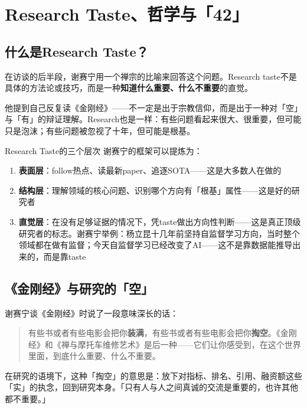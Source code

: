 \documentclass[a4paper]{article}
\begin{document}
\section{Research Taste、哲学与「42」}

\subsection{什么是Research Taste？}

在访谈的后半段，谢赛宁用一个禅宗的比喻来回答这个问题。Research taste不是具体的方法论或技巧，而是一种\textbf{知道什么重要、什么不重要}的直觉。

他提到自己反复读《金刚经》——不一定是出于宗教信仰，而是出于一种对「空」与「有」的辩证理解。Research也是一样：有些问题看起来很大、很重要，但可能只是泡沫；有些问题被忽视了十年，但可能是根基。

\begin{knowledgebox}{Research Taste的三个层次}
谢赛宁的框架可以提炼为：
\begin{enumerate}
  \item \textbf{表面层}：follow热点、读最新paper、追逐SOTA——这是大多数人在做的
  \item \textbf{结构层}：理解领域的核心问题、识别哪个方向有「根基」属性——这是好的研究者
  \item \textbf{直觉层}：在没有足够证据的情况下，凭taste做出方向性判断——这是真正顶级研究者的标志。谢赛宁举例：杨立昆十几年前坚持自监督学习方向，当时整个领域都在做有监督；今天自监督学习已经改变了AI——这不是靠数据能推导出来的，而是靠taste
\end{enumerate}
\end{knowledgebox}

\subsection{《金刚经》与研究的「空」}

谢赛宁谈《金刚经》时说了一段意味深长的话：

\begin{quote}
有些书或者有些电影会把你\textbf{装满}，有些书或者有些电影会把你\textbf{掏空}。《金刚经》和《禅与摩托车维修艺术》是后一种——它们让你感受到，在这个世界里面，到底什么重要、什么不重要。
\end{quote}

在研究的语境下，这种「掏空」的意思是：放下对指标、排名、引用、融资额这些「实」的执念，回到研究本身。「只有人与人之间真诚的交流是重要的，也许其他都不重要。」
\end{document}
